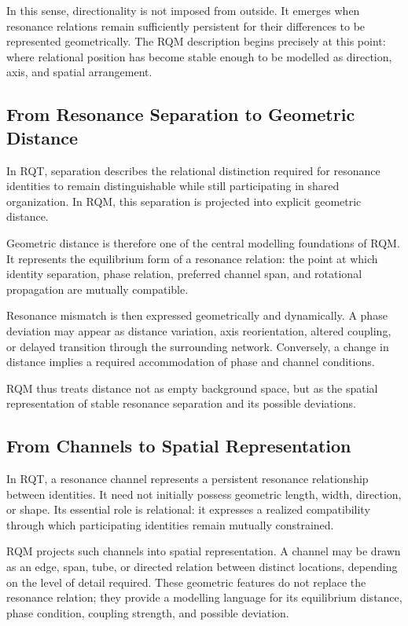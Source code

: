 \documentclass[11pt,a4paper]{article}
\begin{document}
In this sense, directionality is not imposed from outside. It emerges when resonance relations remain sufficiently persistent for their differences to be represented geometrically. The RQM description begins precisely at this point: where relational position has become stable enough to be modelled as direction, axis, and spatial arrangement.


\subsection{From Resonance Separation to Geometric Distance}

In RQT, separation describes the relational distinction required for resonance identities to remain distinguishable while still participating in shared organization. In RQM, this separation is projected into explicit geometric distance.

Geometric distance is therefore one of the central modelling foundations of RQM. It represents the equilibrium form of a resonance relation: the point at which identity separation, phase relation, preferred channel span, and rotational propagation are mutually compatible.

Resonance mismatch is then expressed geometrically and dynamically. A phase deviation may appear as distance variation, axis reorientation, altered coupling, or delayed transition through the surrounding network. Conversely, a change in distance implies a required accommodation of phase and channel conditions.

RQM thus treats distance not as empty background space, but as the spatial representation of stable resonance separation and its possible deviations.


\subsection{From Channels to Spatial Representation}

In RQT, a resonance channel represents a persistent resonance relationship between identities. It need not initially possess geometric length, width, direction, or shape. Its essential role is relational: it expresses a realized compatibility through which participating identities remain mutually constrained.

RQM projects such channels into spatial representation. A channel may be drawn as an edge, span, tube, or directed relation between distinct locations, depending on the level of detail required. These geometric features do not replace the resonance relation; they provide a modelling language for its equilibrium distance, phase condition, coupling strength, and possible deviation.
\end{document}
